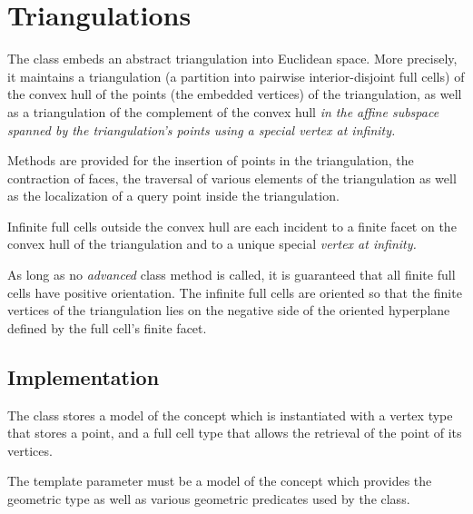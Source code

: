 \section{Triangulations}

The class  embeds an abstract 
triangulation into Euclidean space. More precisely, it
maintains a triangulation (a partition into pairwise interior-disjoint
full cells) of the convex hull of the points (the embedded vertices) of the
triangulation, as well as a triangulation of the complement of the convex hull
\em{in the affine subspace} spanned by the triangulation's points
using a special vertex at infinity.

Methods are provided for the insertion of points in the triangulation, the
contraction of faces, the traversal of various elements of the triangulation
as well as the localization of a query point inside the triangulation.

Infinite full cells outside the convex hull are each incident to
a finite facet on the convex hull of the triangulation and to a unique special
\em{vertex at infinity}. 

As long as no \emph{advanced} class method is called, it is guaranteed that
all finite full cells have positive orientation. The infinite full cells are
oriented so that the finite vertices of the triangulation lies on the negative side of
the oriented hyperplane defined by the full cell's finite facet.



\subsection{Implementation}

The class  stores a model \tds
of the concept  which is instantiated with a
vertex type that stores a point, and a full cell type that allows the retrieval
of the point of its vertices.

The template parameter  must be a model of the concept
 which provides the geometric  type as well
as various geometric predicates used by the  class.

